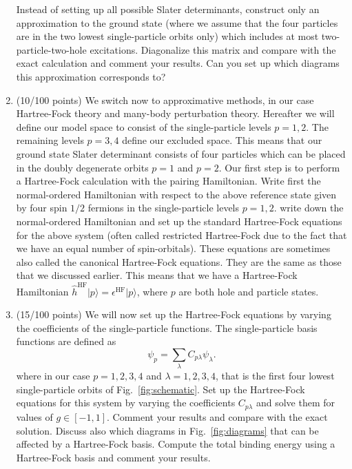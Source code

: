 \documentclass[prc]{revtex4} \usepackage[dvips]{graphicx}
\begin{document}
\begin{enumerate}
Instead of setting up all possible Slater determinants, construct only
an approximation to the ground state (where we assume that the four
particles are in the two lowest single-particle orbits only) which
includes at most two-particle-two-hole excitations. Diagonalize this
matrix and compare with the exact calculation and comment your
results. Can you set up which diagrams this approximation corresponds
to?
\item  (10/100 points) We switch now to approximative methods, in our case Hartree-Fock
  theory and many-body perturbation theory. Hereafter we will define
  our model space to consist of the single-particle levels $p=1,2$.
  The remaining levels $p=3,4$ define our excluded space.  This means
  that our ground state Slater determinant consists of four particles
  which can be placed in the doubly degenerate orbits $p=1$ and $p=2$.
  Our first step is to perform a Hartree-Fock calculation with the
  pairing Hamiltonian.  Write first the normal-ordered Hamiltonian
  with respect to the above reference state given by four spin $1/2$
  fermions in the single-particle levels $p=1,2$. write down the normal-ordered
  Hamiltonian and set up the standard Hartree-Fock equations for the above system
  (often called restricted Hartree-Fock due to the fact that  we have an equal number of spin-orbitals).
  These equations are sometimes also called the canonical Hartree-Fock equations. They are the same as those that we discussed earlier. This means that we have
  a Hartree-Fock Hamiltonian $\hat{h}^{\mathrm{HF}}\vert p\rangle = \epsilon^{\mathrm{HF}}\vert p\rangle$, where $p$ are both hole and particle states.
  
\item  (15/100 points)
We will now set up the Hartree-Fock equations by varying the
coefficients of the single-particle functions. The single-particle
basis functions are defined as
\[
\psi_p = \sum_{\lambda} C_{p\lambda}\psi_{\lambda}.
\]
where in our case $p=1,2,3,4$ and $\lambda=1,2,3,4$, that is the first
four lowest single-particle orbits of Fig.~\ref{fig:schematic}.  Set
up the Hartree-Fock equations for this system by varying the
coefficients $C_{p\lambda}$ and solve them for values of $g\in
[-1,1]$.  Comment your results and compare with the exact
solution. Discuss also which diagrams in Fig.~\ref{fig:diagrams} that
can be affected by a Hartree-Fock basis. Compute the total binding
energy using a Hartree-Fock basis and comment your results.


\end{enumerate}
\end{document}
